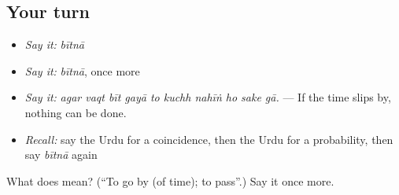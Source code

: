 \subsection*{Your turn}
\begin{itemize}
\raggedright
  \item \emph{Say it:} \emph{bītnā}
  \item \emph{Say it:} \emph{bītnā}, once more
  \item \emph{Say it:} \emph{agar vaqt bīt gayā to kuchh nahīṅ ho sake gā.} — If the time slips by, nothing can be done.
  \item \emph{Recall:} say the Urdu for a coincidence, then the Urdu for a probability, then say \emph{bītnā} again
\end{itemize}

\begin{tcolorbox}[breakable,colback=teal!4,colframe=teal!35!black,title={Before you move on}]
What does  mean? (\textquotedblleft{}To go by (of time); to pass\textquotedblright{}.) Say it once more.
\end{tcolorbox}
